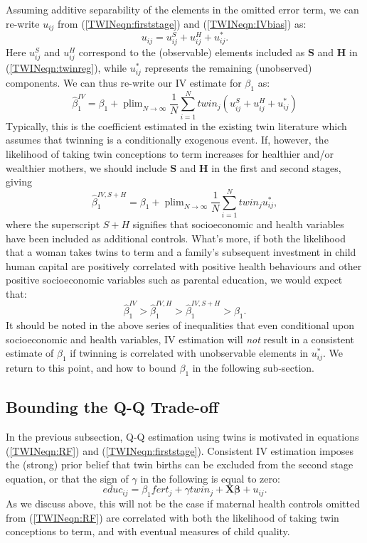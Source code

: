 \documentclass[subeqn]{article}
\DeclareMathOperator{\plim}{plim}
\begin{document}
\begin{spacing}{1.4}
Assuming additive separability of the elements in the omitted error term, we can 
re-write $u_{ij}$ from (\ref{TWINeqn:firststage}) and (\ref{TWINeqn:IVbias}) as:
\[ u_{ij}=u^S_{ij}+u^H_{ij}+u^*_{ij}. \]
Here $u^S_{ij}$ and $u^H_{ij}$ correspond to the (observable) elements included 
as $\bm{S}$ and $\bm{H}$ in (\ref{TWINeqn:twinreg}), while $u^*_{ij}$ represents 
the remaining (unobserved) components.  We can thus re-write our IV estimate for 
$\beta_1$ as:
\begin{equation}
\label{TWINeqn:betabias}
\hat\beta_1^{IV} = \beta_1 + 
\plim_{N\to \infty} \frac{1}{N}\sum_{i=1}^N twin_j(u^S_{ij}+u^H_{ij}+u^*_{ij})
\end{equation}
Typically, this is the coefficient estimated in the existing twin literature 
which assumes that twinning is a conditionally exogenous event.  If, however, the 
likelihood of taking twin conceptions to term increases for healthier and/or 
wealthier mothers, we should include $\bm{S}$ and $\bm{H}$ in the first and 
second stages, giving
\begin{equation}
\label{TWINeqn:betacloser}
\hat\beta_1^{IV,S+H} = \beta_1 +
\plim_{N\to \infty} \frac{1}{N}\sum_{i=1}^N twin_ju^*_{ij},
\end{equation}
where the superscript $S+H$ signifies that socioeconomic and health variables 
have been included as additional controls.  What's more, if both the likelihood
that a woman takes twins to term and a family's subsequent investment in child 
human capital are positively correlated with positive health behaviours and other 
positive socioeconomic variables such as parental education, we would expect that:
\[
\hat\beta_1^{IV}>\hat\beta_1^{IV,H}>\hat\beta_1^{IV,S+H}>\beta_1.
\]
It should be noted in the above series of inequalities that even conditional upon
socioeconomic and health variables, IV estimation will \emph{not} result in a
consistent estimate of $\beta_1$ if twinning is correlated with unobservable
elements in $u^*_{ij}$.  We return to this point, and how to bound $\beta_1$ in
the following sub-section.


\subsection{Bounding the Q-Q Trade-off}            \label{TWINsscn:methodBounds}
In the previous subsection, Q-Q estimation using twins is motivated in equations 
(\ref{TWINeqn:RF}) and (\ref{TWINeqn:firststage}).  Consistent IV estimation 
imposes the (strong) prior belief that twin births can be excluded from the 
second stage equation, or that the sign of $\gamma$ in the following is equal to 
zero:
\begin{equation}
\label{TWINeqn:Conley}
educ_{ij}=\beta_1 fert_j + \gamma twin_j + \bm{X}\bm{\beta} + u_{ij}.
\end{equation}
As we discuss above, this will not be the case if maternal health controls 
omitted from (\ref{TWINeqn:RF}) are correlated with both the likelihood of taking
twin conceptions to term, and with eventual measures of child quality.


\end{spacing}
\end{document}
